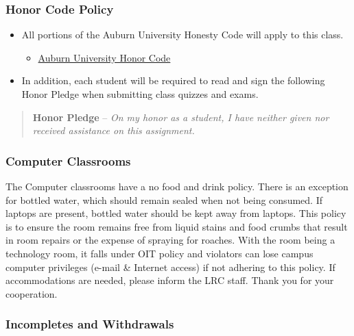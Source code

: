 \documentclass[11pt,]{article}
\providecommand{\tightlist}{%
  \setlength{\itemsep}{0pt}\setlength{\parskip}{0pt}}
\begin{document}
\hypertarget{honor-code-policy}{%
\subsubsection{Honor Code Policy}\label{honor-code-policy}}

\begin{itemize}
\tightlist
\item
  All portions of the Auburn University Honesty Code will apply to this
  class.

  \begin{itemize}
  \tightlist
  \item
    \href{https://sites.auburn.edu/admin/universitypolicies/Policies/AcademicHonestyCode.pdf}{Auburn
    University Honor Code}
  \end{itemize}
\item
  In addition, each student will be required to read and sign the
  following Honor Pledge when submitting class quizzes and exams.
\end{itemize}

\begin{quote}
\textbf{Honor Pledge} -- \emph{On my honor as a student, I have neither
given nor received assistance on this assignment.}
\end{quote}

\hypertarget{computer-classrooms}{%
\subsubsection{Computer Classrooms}\label{computer-classrooms}}

The Computer classrooms have a no food and drink policy. There is an
exception for bottled water, which should remain sealed when not being
consumed. If laptops are present, bottled water should be kept away from
laptops. This policy is to ensure the room remains free from liquid
stains and food crumbs that result in room repairs or the expense of
spraying for roaches. With the room being a technology room, it falls
under OIT policy and violators can lose campus computer privileges
(e-mail \& Internet access) if not adhering to this policy. If
accommodations are needed, please inform the LRC staff. Thank you for
your cooperation.

\hypertarget{incompletes-and-withdrawals}{%
\subsubsection{Incompletes and
Withdrawals}\label{incompletes-and-withdrawals}}
\end{document}
